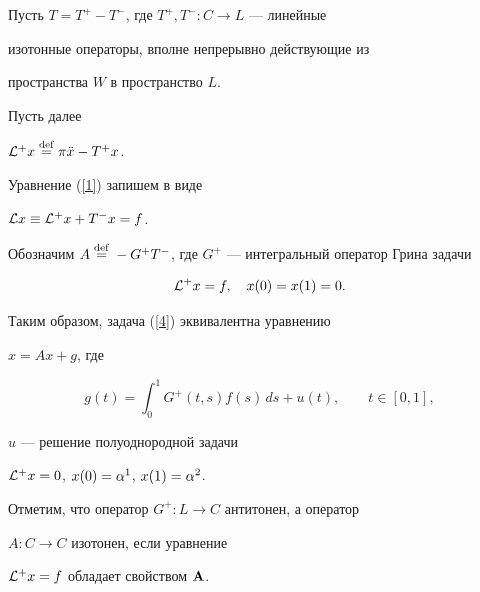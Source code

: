 Пусть $T=T^+-T^-$, где $T^+,T^-:C\to L$ --- линейные


изотонные операторы, вполне непрерывно действующие из


пространства $W$ в пространство $L$.


Пусть далее


${\cal L}^+x\overset{\mathrm{def}}{=}{}\pi\Ddot x-T^+x$.


Уравнение (\ref{1}) запишем в виде


${\cal L} x\equiv{\cal L}^+x+T^-x=f$.


Обозначим $A\overset{\mathrm{def}}{=}{}-G^+T^-$, где $G^+$ --- интегральный оператор Грина задачи


$$


\L^+x=f,\quad x(0)=x(1)=0.


$$


Таким образом, задача (\ref{4}) эквивалентна уравнению


$x=Ax+g$, где


$$


g(t)=\int_0^1G^+(t,s)f(s)\,ds+u(t),\qquad t\in[0,1],


$$


$u$ --- решение полуоднородной задачи


${\cal L}^+x=0$, $x(0)=\alpha^1$, $x(1)=\alpha^2$.





Отметим, что оператор $G^+:L\to C$ антитонен, а оператор


$A:C\to C$ изотонен, если уравнение


${\cal L}^+x=f$ обладает свойством $\bold A$.





